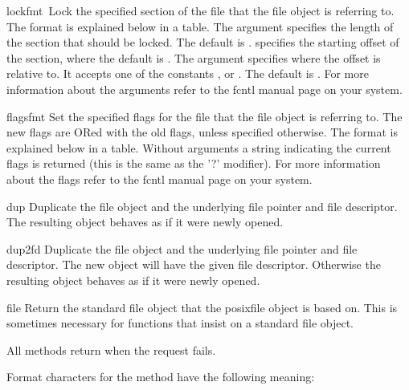 \renewcommand{\indexsubitem}{(posixfile method)}
\begin{funcdesc}{lock}{fmt\, }
 Lock the specified section of the file that the file object is
 referring to.  The format is explained
 below in a table.  The  argument specifies the length of the
 section that should be locked. The default is . 
 specifies the starting offset of the section, where the default is
 .  The  argument specifies where the offset is
 relative to. It accepts one of the constants ,
  or .  The default is .
 For more information about the arguments refer to the fcntl
 manual page on your system.
\end{funcdesc}

\begin{funcdesc}{flags}{fmt}
 Set the specified flags for the file that the file object is referring
 to.  The new flags are ORed with the old flags, unless specified
 otherwise.  The format is explained below in a table.  Without
 arguments a string indicating the current flags is returned (this is
 the same as the '?' modifier).  For more information about the flags
 refer to the fcntl manual page on your system.
\end{funcdesc}

\begin{funcdesc}{dup}{}
 Duplicate the file object and the underlying file pointer and file
 descriptor.  The resulting object behaves as if it were newly
 opened.
\end{funcdesc}

\begin{funcdesc}{dup2}{fd}
 Duplicate the file object and the underlying file pointer and file
 descriptor.  The new object will have the given file descriptor.
 Otherwise the resulting object behaves as if it were newly opened.
\end{funcdesc}

\begin{funcdesc}{file}{}
 Return the standard file object that the posixfile object is based
 on.  This is sometimes necessary for functions that insist on a
 standard file object.
\end{funcdesc}

All methods return  when the request fails.

Format characters for the  method have the following meaning:

